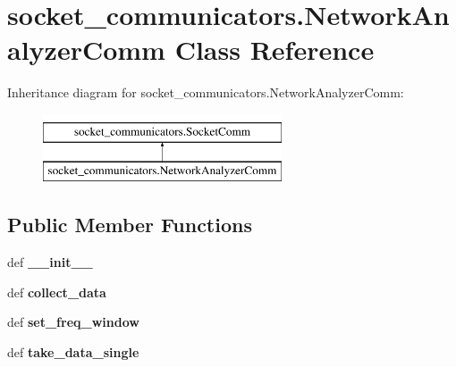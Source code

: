 \hypertarget{classsocket__communicators_1_1_network_analyzer_comm}{\section{socket\-\_\-communicators.\-Network\-Analyzer\-Comm Class Reference}
\label{classsocket__communicators_1_1_network_analyzer_comm}
}
Inheritance diagram for socket\-\_\-communicators.\-Network\-Analyzer\-Comm\-:\begin{figure}[H]
\begin{center}
\leavevmode
\includegraphics[height=2.000000cm]{classsocket__communicators_1_1_network_analyzer_comm}
\end{center}
\end{figure}
\subsection*{Public Member Functions}
\begin{DoxyCompactItemize}
\item 
\hypertarget{classsocket__communicators_1_1_network_analyzer_comm_a209ee51a068801999157f62644fe242d}{def {\bfseries \-\_\-\-\_\-init\-\_\-\-\_\-}}\label{classsocket__communicators_1_1_network_analyzer_comm_a209ee51a068801999157f62644fe242d}

\item 
\hypertarget{classsocket__communicators_1_1_network_analyzer_comm_a95a2c7743bb11fd9b874efa6f3d11036}{def {\bfseries collect\-\_\-data}}\label{classsocket__communicators_1_1_network_analyzer_comm_a95a2c7743bb11fd9b874efa6f3d11036}

\item 
\hypertarget{classsocket__communicators_1_1_network_analyzer_comm_a6a267091c41f5b54e87a4cd2053d1e01}{def {\bfseries set\-\_\-freq\-\_\-window}}\label{classsocket__communicators_1_1_network_analyzer_comm_a6a267091c41f5b54e87a4cd2053d1e01}

\item 
\hypertarget{classsocket__communicators_1_1_network_analyzer_comm_a3b76423b7fe0c3f4a68dafb80cf49e15}{def {\bfseries take\-\_\-data\-\_\-single}}\label{classsocket__communicators_1_1_network_analyzer_comm_a3b76423b7fe0c3f4a68dafb80cf49e15}

\end{DoxyCompactItemize}
